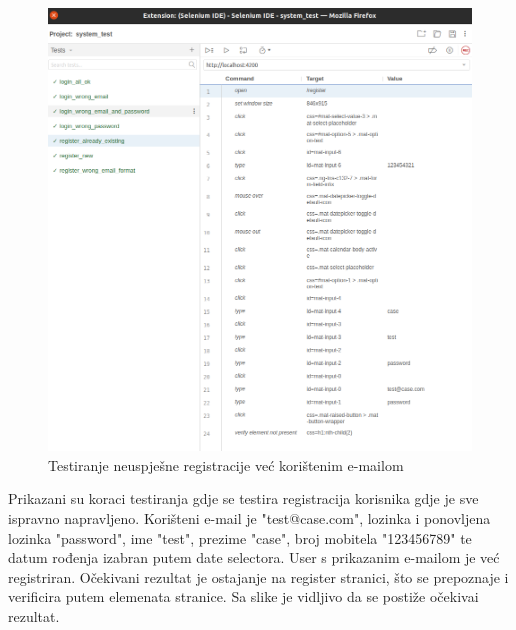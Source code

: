             \begin{figure}[H]
                \includegraphics[width=\textwidth]{slike/tests_system/register_already_existing.png} %
                \caption{Testiranje neuspješne registracije već korištenim e-mailom}
                \label{fig:struktura} %
            \end{figure}
            Prikazani su koraci testiranja gdje se testira registracija korisnika gdje je sve ispravno napravljeno. Korišteni e-mail je "test@case.com", lozinka i ponovljena lozinka "password", ime "test", prezime "case", broj mobitela "123456789" te datum rođenja izabran putem date selectora. User s prikazanim e-mailom je već registriran. Očekivani rezultat je ostajanje na register stranici, što se prepoznaje i verificira putem elemenata stranice. Sa slike je vidljivo da se postiže očekivai rezultat.

